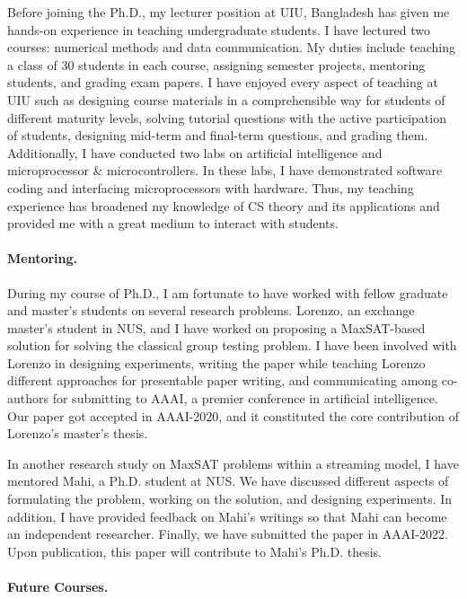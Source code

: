 \documentclass[11pt]{article}
\begin{document}
		
		Before joining the Ph.D., my lecturer position at UIU, Bangladesh has given me hands-on experience in teaching undergraduate students. I have lectured two courses: numerical methods and data communication. My duties include teaching a class of 30 students in each course, assigning semester projects, mentoring students, and grading exam papers.  I have enjoyed every aspect of teaching at UIU such as designing course materials in a comprehensible way for students of different maturity levels, solving tutorial questions with the active participation of students, designing mid-term and final-term questions, and grading them. Additionally, I have conducted two labs on artificial intelligence and microprocessor \& microcontrollers. In these labs, I have demonstrated software coding and interfacing microprocessors with hardware. Thus, my teaching experience has broadened my knowledge of CS theory and its applications and provided me with a great medium to interact with students. 
		
		
	\paragraph{Mentoring.}
	
		During my course of Ph.D., I am fortunate to have worked with fellow graduate and master's students on several research problems. Lorenzo, an exchange master's student in NUS, and I have worked on proposing a MaxSAT-based solution for solving the classical group testing problem. I have been involved with Lorenzo in designing experiments, writing the paper while teaching Lorenzo different approaches for presentable paper writing, and communicating among co-authors for submitting to AAAI, a premier conference in artificial intelligence. Our paper got accepted in AAAI-2020, and it constituted the core contribution of Lorenzo's master's thesis.
		
		In another research study on MaxSAT problems within a streaming model, I have mentored Mahi, a Ph.D. student at NUS. We have discussed different aspects of formulating the problem, working on the solution, and designing experiments. In addition, I have provided feedback on Mahi's writings so that Mahi can become an independent researcher. Finally, we have submitted the paper in AAAI-2022. Upon publication, this paper will contribute to Mahi's Ph.D. thesis.

	
	\paragraph{Future Courses.}
	
\end{document}
